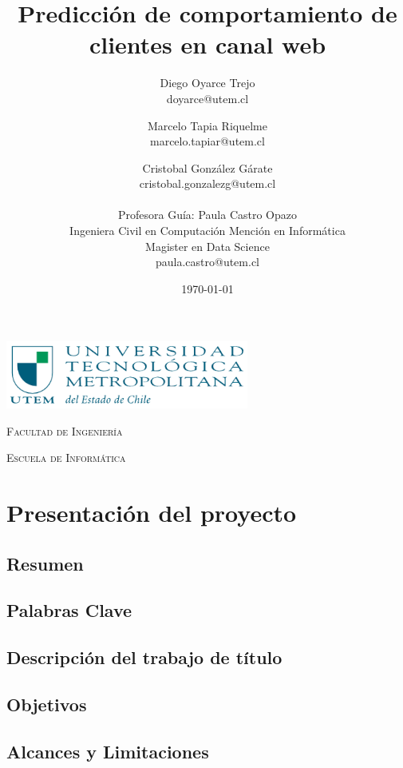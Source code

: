 \documentclass{report}
\title{\Huge Predicción de comportamiento de clientes en canal web}
\author{Diego Oyarce Trejo \\ doyarce@utem.cl \and
        Marcelo Tapia Riquelme \\ marcelo.tapiar@utem.cl \and
        Cristobal González Gárate \\ cristobal.gonzalezg@utem.cl \\
        \vspace{2.0cm}
        \\Profesora Guía: Paula Castro Opazo \\Ingeniera Civil en Computación Mención en Informática \\Magister en Data Science \\paula.castro@utem.cl
        }
\date{\today}
\begin{document}
\begin{titlepage}
  \centering  
  \includegraphics[width=0.6\textwidth]{img/logoutem.png}  
  \vspace{1cm}
  
  \textsc{\normalsize Facultad de Ingeniería}  
  \vspace{0.5cm}
  
  \textsc{\normalsize Escuela de Informática}
  {\let\newpage\relax\maketitle}
\end{titlepage}

\tableofcontents

\listoffigures

\setcounter{section}{1}

\chapter{Presentación del proyecto}

\section{Resumen}


\section{Palabras Clave}


\section{Descripción del trabajo de título}


\section{Objetivos}


\section{Alcances y Limitaciones}

\end{document}
